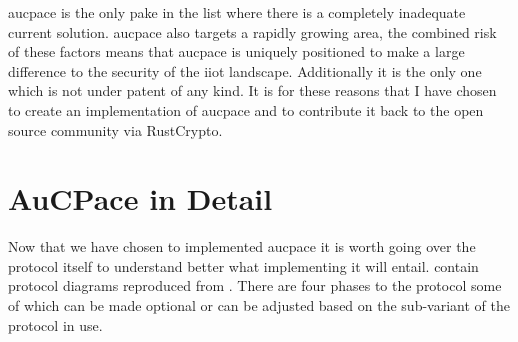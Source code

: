 \gls{aucpace} is the only \gls{pake} in the list where there is a completely inadequate current solution.
\gls{aucpace} also targets a rapidly growing area, the combined risk of these factors means that \gls{aucpace} is uniquely positioned to make a large difference to the security of the \gls{iiot} landscape.
Additionally it is the only one which is not under patent of any kind.
It is for these reasons that I have chosen to create an implementation of \gls{aucpace} and to contribute it back to the open source community via RustCrypto.

\section{AuCPace in Detail}
Now that we have chosen to implemented \gls{aucpace} it is worth going over the protocol itself to understand better what implementing it will entail.
 contain protocol diagrams reproduced from \cite{aucpace}.
There are four phases to the protocol some of which can be made optional or can be adjusted based on the sub-variant of the protocol in use.

